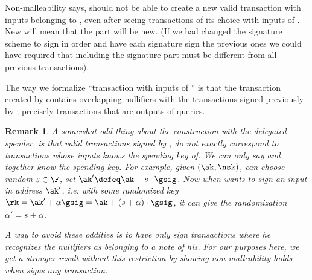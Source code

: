 \documentclass[11pt]{article}
\numberwithin{equation}{section} %
\numberwithin{figure}{section} %
\newtheorem{remark}[thm]{Remark}
\begin{document}
Non-malleability says, \adv should not be able to create a new valid transaction with inputs belonging to \oracle,
even after seeing transactions of its choice with inputs of \oracle. New will mean that the \rawtx part will be new.
(If we had changed the signature scheme to sign in order and have each signature sign the previous ones we could have required that
\tx including the signature part must be different from all previous transactions).

The way we formalize ``transaction with inputs of \oracle'' is that the transaction created by \adv contains 
overlapping nullifiers with the transactions signed previously by \oracle; precisely transactions that are outputs of \signallinputs queries.

\begin{remark}\label{rem:weirdstuff}
 A somewhat odd thing about the construction with the delegated spender, is that valid transactions signed by \oracle, do not exactly correspond to transactions whose inputs \oracle knows the spending key of. We can only say \oracle and \adv \emph{together} know the spending key.
 For example, given $(\ak,\nsk)$, \adv can choose random $s\in \F$, set $\ak' \defeq \ak + s\cdot \gsig$.   
 Now when \adv wants to sign an input in address $\ak'$, i.e. with some randomized key $\rk = \ak'+ \alpha \gsig  = \ak + (s+\alpha)\cdot \gsig$,
 it can give \oracle the randomization $\alpha' = s+\alpha$.
 
 A way to avoid these oddities is to have \oracle only sign transactions where he recognizes the nullifiers as belonging to a note of his.
 For our purposes here, we get a stronger result without this restriction by showing non-malleability holds when \oracle signs \emph{any} transaction.
\end{remark}
\end{document}
